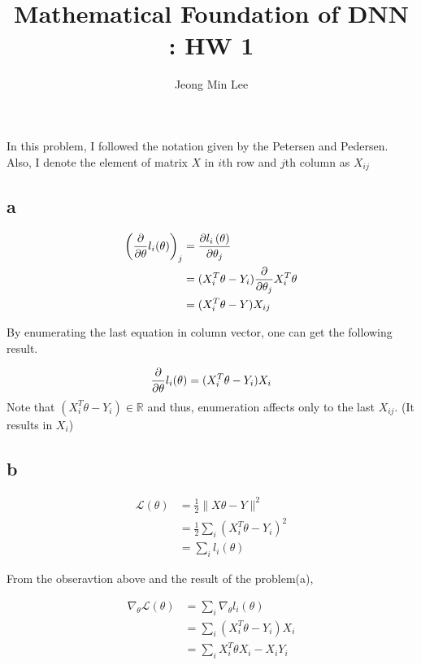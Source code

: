 \documentclass[10pt]{article}
\title{\textbf{Mathematical Foundation of DNN : HW 1}}
\author{Jeong Min Lee}
\begin{document}
\maketitle

\section{}
In this problem, I followed the notation given by the Petersen and Pedersen\cite{Petersen2008}. Also, I denote the element of matrix $X$ in $i$th row and $j$th column as $X_{ij}$
\subsection*{a}
\begin{align} 
    \left({\partial \over \partial \theta} l_i(\theta)\right)_j &= {\partial l_i \left(\theta\right)\over \partial \theta_j} \\
    &= (X_i^T\theta - Y_i){\partial \over \partial \theta_j} X_i^T \theta \\
    &= (X_i^T\theta - Y) X_{ij}
\end{align}

By enumerating the last equation in column vector, one can get the following result.

\begin{equation}
    {\partial \over \partial \theta} l_i(\theta) = (X_i^T\theta - Y_i)X_i
\end{equation}
Note that $(X_i^T\theta - Y_i)\in \mathbb{R}$ and thus, enumeration affects only to the last $X_{ij}$. (It results in $X_i$) 

\subsection*{b}
\begin{align}
    \mathcal{L}(\theta) &= \frac{1}{2} \lVert X\theta - Y \rVert^2 \\ &= \frac{1}{2}\sum_i \left(X_i^T\theta - Y_i\right)^2 \\ &= \sum_i l_i(\theta)    
\end{align}

From the obseravtion above and the result of the problem(a),

\begin{align}
    \nabla_\theta \mathcal{L}(\theta) &= \sum_i \nabla_\theta l_i(\theta) \\ &= \sum_i (X_i^T\theta - Y_i)X_i \\ &= \sum_i X_i^T\theta X_i - X_i Y_i
\end{align}
\end{document}
